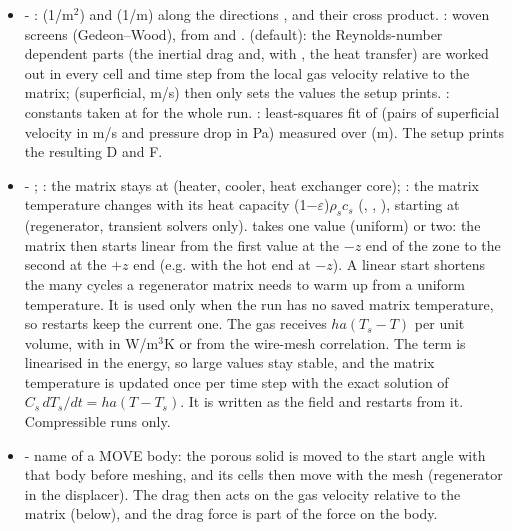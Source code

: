 \begin{itemize}
    \item {} - :  (1/m$^2$) and  (1/m) along the directions ,  and their cross product. : woven screens (Gedeon--Wood), from  and .  (default): the Reynolds-number dependent parts (the inertial drag and, with , the heat transfer) are worked out in every cell and time step from the local gas velocity relative to the matrix;  (superficial, m/s) then only sets the values the setup prints. : constants taken at  for the whole run. : least-squares fit of  (pairs of superficial velocity in m/s and pressure drop in Pa) measured over  (m). The setup prints the resulting D and F.
    \item {} - ; : the matrix stays at  (heater, cooler, heat exchanger core); : the matrix temperature changes with its heat capacity (1$-\varepsilon$)$\rho_s c_s$ (, , ), starting at  (regenerator, transient solvers only).  takes one value (uniform) or two: the matrix then starts linear from the first value at the $-z$ end of the zone to the second at the $+z$ end (e.g.  with the hot end at $-z$). A linear start shortens the many cycles a regenerator matrix needs to warm up from a uniform temperature. It is used only when the run has no saved matrix temperature, so restarts keep the current one. The gas receives $h a (T_s - T)$ per unit volume, with  in W/m$^3$K or  from the wire-mesh correlation. The term is linearised in the energy, so large values stay stable, and the matrix temperature is updated once per time step with the exact solution of $C_s\,dT_s/dt = h a (T - T_s)$. It is written as the field  and restarts from it. Compressible runs only.
    \item {} - name of a MOVE body: the porous solid is moved to the start angle with that body before meshing, and its cells then move with the mesh (regenerator in the displacer). The drag then acts on the gas velocity relative to the matrix (below), and the drag force is part of the force on the body.
\end{itemize}
